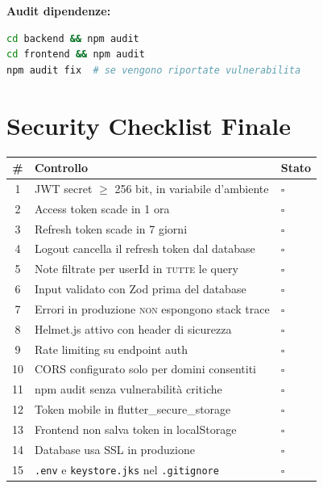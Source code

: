 \textbf{Audit dipendenze:}
\begin{lstlisting}[language=bash]
cd backend && npm audit
cd frontend && npm audit
npm audit fix  # se vengono riportate vulnerabilita
\end{lstlisting}

\section{Security Checklist Finale}

\begin{praticabox}[title={Pratica --- Verifica completa}]
\begin{center}
\begin{small}
\begin{tabularx}{\textwidth}{c l X}
\toprule
\textbf{\#} & \textbf{Controllo} & \textbf{Stato} \\
\midrule
1 & JWT secret $\geq$ 256 bit, in variabile d'ambiente & $\square$ \\
2 & Access token scade in 1 ora & $\square$ \\
3 & Refresh token scade in 7 giorni & $\square$ \\
4 & Logout cancella il refresh token dal database & $\square$ \\
5 & Note filtrate per userId in \textsc{tutte} le query & $\square$ \\
6 & Input validato con Zod prima del database & $\square$ \\
7 & Errori in produzione \textsc{non} espongono stack trace & $\square$ \\
8 & Helmet.js attivo con header di sicurezza & $\square$ \\
9 & Rate limiting su endpoint auth & $\square$ \\
10 & CORS configurato solo per domini consentiti & $\square$ \\
11 & npm audit senza vulnerabilità critiche & $\square$ \\
12 & Token mobile in flutter\_secure\_storage & $\square$ \\
13 & Frontend non salva token in localStorage & $\square$ \\
14 & Database usa SSL in produzione & $\square$ \\
15 & \texttt{.env} e \texttt{keystore.jks} nel \texttt{.gitignore} & $\square$ \\
\bottomrule
\end{tabularx}
\end{small}
\end{center}
\end{praticabox}

